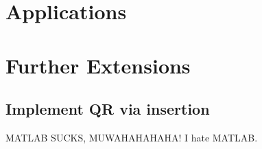 \documentclass[12pt]{amsart}
\theoremstyle{plain}
\theoremstyle{plain}
\theoremstyle{plain}
\theoremstyle{plain}
\theoremstyle{plain}
\theoremstyle{plain}
\theoremstyle{plain}
\theoremstyle{plain}
\begin{document}
\section{Applications}

\section{Further Extensions}
\subsection{Implement QR via insertion}
MATLAB SUCKS, MUWAHAHAHAHA!  I hate MATLAB.
\end{document}
